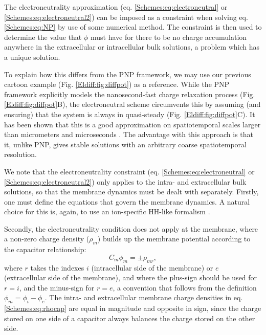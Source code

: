 The electroneutrality approximation (eq. \ref{Schemes:eq:electroneutral} or \ref{Schemes:eq:electroneutral2}) can be imposed as a constraint when solving eq.\ref{Schemes:eq:NP} by use of some numerical method. The constraint is then used to determine the value that $\phi$ must have for there to be no charge accumulation anywhere in the extracellular or intracellular bulk solutions, a problem which has a unique solution. 

To explain how this differs from the PNP framework, we may use our previous cartoon example (Fig. \ref{Eldiff:fig:diffpot}) as a reference. While the PNP framework explicitly models the nanosecond-fast charge relaxation process (Fig. \ref{Eldiff:fig:diffpot}B), the electroneutral scheme circumvents this by assuming (and ensuring) that the system is always in quasi-steady (Fig. \ref{Eldiff:fig:diffpot}C). It has been shown that this is a good approximation on spatiotemporal scales larger than micrometers and microseconds \citep{Grodzinsky2011, Pods2017, Solbra2018}. The advantage with this approach is that it, unlike PNP, gives stable solutions with an arbitrary coarse spatiotemporal resolution.

We note that the electroneutrality constraint (eq. \ref{Schemes:eq:electroneutral} or \ref{Schemes:eq:electroneutral2}) only applies to the intra- and extracellular bulk solutions, so that the membrane dynamics must be dealt with separately. Firstly, one must define the equations that govern the membrane dynamics. A natural choice for this is, again, to use an ion-specific HH-like formalism \citep{Mori2006, Mori2009, Pods2017, ellingsrud2020}. 

Secondly, the electroneutrality condition does not apply at the membrane, where a non-zero charge density ($\rho_{m}$) builds up the membrane potential according to the capacitor relationship:
\begin{equation}
C_m \phi_{m} = \pm \rho_{mr},
\label{Schemes:eq:rhocap}
\end{equation}
where $r$ takes the indexes $i$ (intracellular side of the membrane) or $e$ (extracellular side of the membrane), and where the plus-sign should be used for $r=i$, and the minus-sign for $r=e$, a convention that follows from the definition $\phi_{m} = \phi_{i} - \phi_{e}$. The intra- and extracellular membrane charge densities in eq. \ref{Schemes:eq:rhocap} are equal in magnitude and opposite in sign, since the charge stored on one side of a capacitor always balances the charge stored on the other side. 


